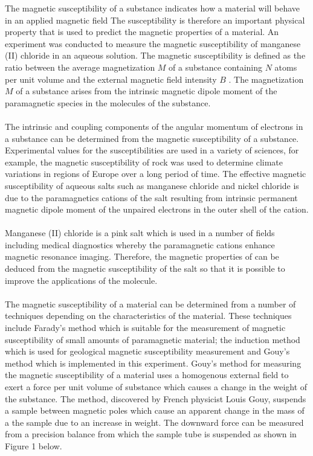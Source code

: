 \documentclass[a4paper,11pt]{article}
\begin{document}
The magnetic susceptibility of a substance indicates how a material will behave in an applied magnetic field The susceptibility is therefore an important physical property that is used to predict the magnetic properties of a material. An experiment was conducted to measure the magnetic susceptibility of manganese (II) chloride in an aqueous solution. The magnetic susceptibility is defined as the ratio between the average magnetization $M$ of a substance containing $N$ atoms per unit volume and the external magnetic field intensity $B$ \cite{marcon2012}. The magnetization $M$ of a substance arises from the intrinsic magnetic dipole moment of the paramagnetic species in the molecules of the substance.\\
\\
The intrinsic and coupling components of the angular momentum of electrons in a substance can be determined from the magnetic susceptibility of a substance. Experimental values for the susceptibilities are used in a variety of sciences, for example, the magnetic susceptibility of rock was used to determine climate variations in regions of Europe over a long period of time\cite{rochette1992}. The effective magnetic susceptibility of aqueous salts such as manganese chloride  and nickel chloride  is due to the paramagnetics cations of the salt resulting from intrinsic permanent magnetic dipole moment of the unpaired electrons in the outer shell of the cation.\\
\\
Manganese (II) chloride is a pink salt which is used in a number of fields including medical diagnostics whereby the paramagnetic  cations enhance magnetic resonance imaging\cite{aoki2004}. Therefore, the magnetic properties of  can be deduced from the magnetic susceptibility of the salt so that it is possible to improve the applications of the molecule.\\
\\
The magnetic susceptibility of a material can be determined from a number of techniques depending on the characteristics of the material. These techniques include Farady's method which is suitable for the measurement of magnetic susceptibility of small amounts of paramagnetic material; the induction method which is used for geological magnetic susceptibility measurement and Gouy's method which is implemented in this experiment. Gouy's method for measuring the magnetic susceptibility of a material uses a homogenous external field to exert a force per unit volume of substance which causes a change in the weight of the substance. The method, discovered by French physicist Louis Gouy, suspends a sample between magnetic poles which cause an apparent change in the mass of a the sample due to an increase in weight. The downward force can be measured from a precision balance from which the sample tube is suspended as shown in Figure 1 below.
\end{document}
